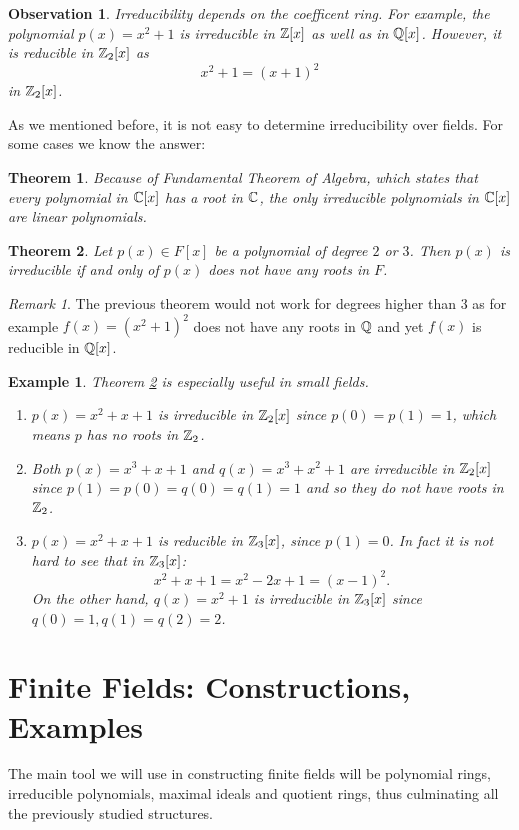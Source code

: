 \documentclass[12pt]{article}
\theoremstyle{plain}
\newtheorem{example}{Example}
\newtheorem{observation}{Observation}
\newtheorem{theorem}{Theorem}
\theoremstyle{definition}
\theoremstyle{remark}
\newtheorem{remark}{Remark}
\begin{document}
\begin{observation}
Irreducibility depends on the coefficent ring. For example, the polynomial $p(x)=x^2+1$ is irreducible in $\mathbb{Z}[x]$ as well as in $\mathbb{Q}[x]$. However, it is reducible in $\mathbb{Z}_2[x]$ as 
$$x^2+1=(x+1)^2$$
in $\mathbb{Z}_2[x]$. 
\end{observation}

As we mentioned before, it is not easy to determine irreducibility over fields. For some cases we know the answer:
\begin{theorem}
Because of Fundamental Theorem of Algebra, which states that every polynomial in $\mathbb{C}[x]$ has a root in $\mathbb{C}$, the only irreducible polynomials in $\mathbb{C}[x]$ are linear polynomials. 
\end{theorem}

\begin{theorem}\label{irr}
Let $p(x)\in F[x]$ be a polynomial of degree $2$ or $3$. Then $p(x)$ is irreducible if and only of $p(x)$ does not have any roots in $F$.
\end{theorem}
\begin{remark}
The previous theorem would not work for degrees higher than $3$ as for example $f(x)=(x^2+1)^2$ does not have any roots in $\mathbb{Q}$ and yet $f(x)$ is reducible in $\mathbb{Q}[x]$. 
\end{remark}
\begin{example}
Theorem \ref{irr} is especially useful in small fields. 
\begin{enumerate}
    \item $p(x)=x^2+x+1$ is irreducible in $\mathbb{Z}_2[x]$ since $p(0)=p(1)=1$, which means $p$ has no roots in $\mathbb{Z}_2$.
    \item Both $p(x)=x^3+x+1$ and $q(x)=x^3+x^2+1$ are irreducible in $\mathbb{Z}_2[x]$ since $p(1)=p(0)=q(0)=q(1)=1$ and so they do not have roots in $\mathbb{Z}_2$. 
    \item $p(x)=x^2+x+1$ is reducible in $\mathbb{Z}_3[x]$, since $p(1)=0$. In fact it is not hard to see that in $\mathbb{Z}_3[x]$:
    $$x^2+x+1 = x^2-2x+1 = (x-1)^2.$$
    On the other hand, $q(x)=x^2+1$ is irreducible in $\mathbb{Z}_3[x]$ since $q(0)=1, q(1)=q(2)=2$. 
\end{enumerate}
\end{example}
\section{Finite Fields: Constructions, Examples}
The main tool we will use in constructing finite fields will be polynomial rings, irreducible polynomials, maximal ideals and quotient rings, thus culminating all the previously studied structures. 
\end{document}
